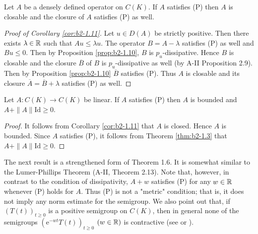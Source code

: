 \begin{corollary}\label{cor:b2-1.11}
Let $A$ be a densely defined operator on $C(K)$.
If $A$ satisfies (P) then $A$ is closable and the closure of $A$ satisfies (P) as well.
\end{corollary}
\begin{proof}[Proof of Corollary \ref{cor:b2-1.11}]
Let $u \in D(A)$ be strictly positive.
Then there exists $\lambda \in \mathbb{R}$ such that $Au \leq \lambda u$.
The operator $B = A - \lambda$ satisfies (P) as well and $Bu \leq 0$.
Then by Proposition \ref{prop:b2-1.10}, $B$ is $p_{u}$-dissipative.
Hence $B$ is closable and the closure $\overline{B}$ of $B$ is $p_{u}$-dissipative as well (by A-II Proposition 2.9).
Then by Proposition \ref{prop:b2-1.10} $\overline{B}$ satisfies (P).
Thus $A$ is closable and its closure $\overline{A} = \overline{B} + \lambda$ satisfies (P) as well.
\end{proof}

\begin{corollary}\label{cor:b2-1.12}
Let $A \colon C(K) \to C(K)$ be linear.
If $A$ satisfies (P) then $A$ is bounded and $A + \|A\|\text{Id} \geq 0$.
\end{corollary}

\begin{proof}
It follows from Corollary \ref{cor:b2-1.11} that $A$ is closed.
Hence $A$ is bounded.
Since $A$ satisfies (P), it follows from Theorem \ref{thm:b2-1.3} that $A + \|A\|\text{Id} \geq 0$.
\end{proof}

The next result is a strengthened form of Theorem 1.6.
It is somewhat similar to the Lumer-Phillips Theorem (A-II, Theorem 2.13).
Note that, however, in contrast to the condition of dissipativity, $A + w$ satisfies (P) for any $w \in \mathbb{R}$ whenever (P) holds for $A$.
Thus (P) is not a "metric" condition; that is, it does not imply any norm estimate for the semigroup.
We also point out that, if $(T(t))_{t \geq 0}$ is a positive semigroup on $C(K)$, then in general none of the semigroups $(\mathrm{e}^{-wt}T(t))_{t \geq 0}$ $(w \in \mathbb{R})$ is contractive (see \citet{battydavies:1983} or \citet{derndinger:1983}).

